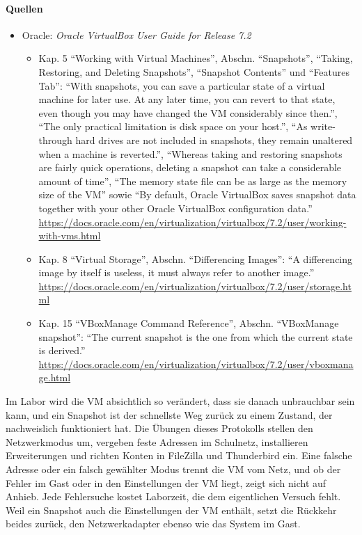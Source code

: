 \paragraph{Quellen}
\begin{itemize}[quellen]
  \item Oracle: \emph{Oracle VirtualBox User Guide for Release 7.2}
  \begin{itemize}[nosep]
    \item Kap. 5 \enquote{Working with Virtual Machines}, Abschn. \enquote{Snapshots}, \enquote{Taking, Restoring, and Deleting Snapshots}, \enquote{Snapshot Contents} und \enquote{Features Tab}: \enquote{With snapshots, you can save a particular state of a virtual machine for later use. At any later time, you can revert to that state, even though you may have changed the VM considerably since then.}, \enquote{The only practical limitation is disk space on your host.}, \enquote{As write-through hard drives are not included in snapshots, they remain unaltered when a machine is reverted.}, \enquote{Whereas taking and restoring snapshots are fairly quick operations, deleting a snapshot can take a considerable amount of time}, \enquote{The memory state file can be as large as the memory size of the VM} sowie \enquote{By default, Oracle VirtualBox saves snapshot data together with your other Oracle VirtualBox configuration data.} \url{https://docs.oracle.com/en/virtualization/virtualbox/7.2/user/working-with-vms.html}
    \item Kap. 8 \enquote{Virtual Storage}, Abschn. \enquote{Differencing Images}: \enquote{A differencing image by itself is useless, it must always refer to another image.} \url{https://docs.oracle.com/en/virtualization/virtualbox/7.2/user/storage.html}
    \item Kap. 15 \enquote{VBoxManage Command Reference}, Abschn. \enquote{VBoxManage snapshot}: \enquote{The current snapshot is the one from which the current state is derived.} \url{https://docs.oracle.com/en/virtualization/virtualbox/7.2/user/vboxmanage.html}
  \end{itemize}
\end{itemize}

\begin{aufgabe}
\end{aufgabe}

Im Labor wird die VM absichtlich so verändert, dass sie danach unbrauchbar sein kann, und ein Snapshot ist der schnellste Weg zurück zu einem Zustand, der nachweislich funktioniert hat. Die Übungen dieses Protokolls stellen den Netzwerkmodus um, vergeben feste Adressen im Schulnetz, installieren Erweiterungen und richten Konten in FileZilla und Thunderbird ein. Eine falsche Adresse oder ein falsch gewählter Modus trennt die VM vom Netz, und ob der Fehler im Gast oder in den Einstellungen der VM liegt, zeigt sich nicht auf Anhieb. Jede Fehlersuche kostet Laborzeit, die dem eigentlichen Versuch fehlt. Weil ein Snapshot auch die Einstellungen der VM enthält, setzt die Rückkehr beides zurück, den Netzwerkadapter ebenso wie das System im Gast.

